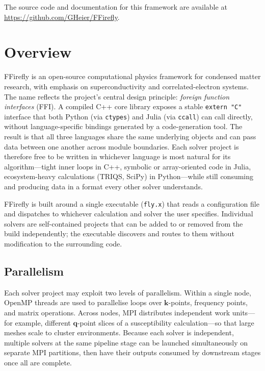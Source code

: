
\label{app:firefly}

The source code and documentation for this framework are available at
\url{https://github.com/GHeier/FFirefly}.

\section{Overview}

FFirefly is an open-source computational physics framework for condensed matter
research, with emphasis on superconductivity and correlated-electron systems.
The name reflects the project's central design principle: \emph{foreign function
interfaces} (FFI).  A compiled C++ core library exposes a stable \texttt{extern "C"}
interface that both Python (via \texttt{ctypes}) and Julia (via \texttt{ccall}) can
call directly, without language-specific bindings generated by a code-generation
tool.  The result is that all three languages share the same underlying objects and
can pass data between one another across module boundaries.  Each solver project is
therefore free to be written in whichever language is most natural for its
algorithm---tight inner loops in C++, symbolic or array-oriented code in Julia,
ecosystem-heavy calculations (TRIQS, SciPy) in Python---while still consuming and
producing data in a format every other solver understands.

FFirefly is built around a single executable (\texttt{fly.x}) that reads a
configuration file and dispatches to whichever calculation and solver the user
specifies.  Individual solvers are self-contained projects that can be added to or
removed from the build independently; the executable discovers and routes to them
without modification to the surrounding code.

\subsection{Parallelism}

Each solver project may exploit two levels of parallelism.  Within a single node,
OpenMP threads are used to parallelise loops over $\mathbf{k}$-points, frequency
points, and matrix operations.  Across nodes, MPI distributes independent
work units---for example, different $\mathbf{q}$-point slices of a susceptibility
calculation---so that large meshes scale to cluster environments.  Because each
solver is independent, multiple solvers at the same pipeline stage can be launched
simultaneously on separate MPI partitions, then have their outputs consumed by
downstream stages once all are complete.

